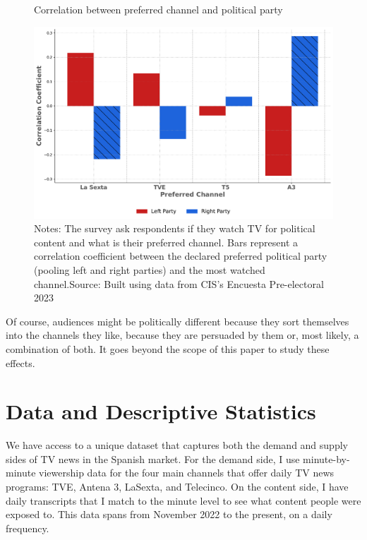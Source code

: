 \documentclass[12pt]{article}
\begin{document}
	\begin{figure}[h!]
		\centering
		\caption{Correlation between preferred channel and political party}
		\includegraphics[width=120mm]{figures/corr_party_channel3}
		\caption*{\small Notes:  The survey ask respondents if they watch TV for political content and what is their preferred channel. Bars represent a correlation coefficient between the declared preferred political party (pooling left and right parties) and the most watched channel.Source: Built using data from CIS's Encuesta Pre-electoral 2023 }
		\label{opinion}
	\end{figure}
	
	
	
	Of course, audiences might be politically different because they sort themselves into the channels they like, because they are persuaded by them or, most likely, a combination of both. It goes beyond the scope of this paper to study these effects. 
	
	
	
	
	
	\section{Data and Descriptive Statistics}
	
	\label{section:data}
	
	We have access to a unique dataset that captures both the demand and supply sides of TV news in the Spanish market. For the demand side, I use minute-by-minute viewership data for the four main channels that offer daily TV news programs: TVE, Antena 3, LaSexta, and Telecinco. On the content side, I have daily transcripts that I match to the minute level to see what content people were exposed to. This data spans from November 2022 to the present, on a daily frequency.
	
\end{document}
